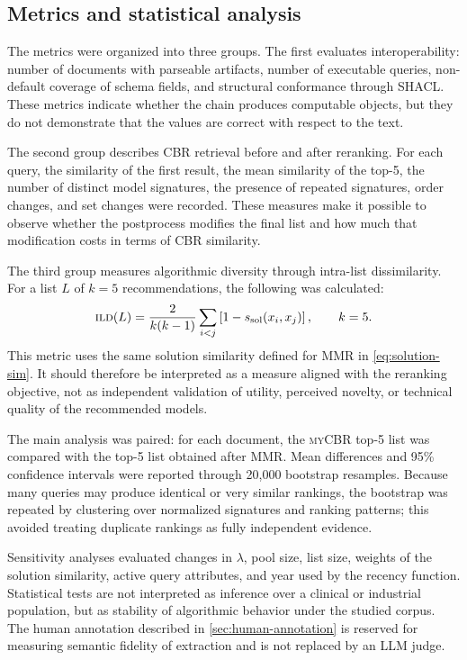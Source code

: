\documentclass[journal]{IEEEtran}
\newcommand{\myCBR}{\textsc{myCBR}}
\newcommand{\ILD}{\textsc{ild}}
\begin{document}
\subsection{Metrics and statistical analysis}

The metrics were organized into three groups. The first evaluates interoperability: number of documents with parseable artifacts, number of executable queries, non-default coverage of schema fields, and structural conformance through SHACL. These metrics indicate whether the chain produces computable objects, but they do not demonstrate that the values are correct with respect to the text.

The second group describes CBR retrieval before and after reranking. For each query, the similarity of the first result, the mean similarity of the top-5, the number of distinct model signatures, the presence of repeated signatures, order changes, and set changes were recorded. These measures make it possible to observe whether the postprocess modifies the final list and how much that modification costs in terms of CBR similarity.

The third group measures algorithmic diversity through intra-list dissimilarity. For a list $L$ of $k=5$ recommendations, the following was calculated:
\begin{equation}
 \ILD(L)=\frac{2}{k(k-1)}\sum_{i<j}\left[1-s_{\mathrm{sol}}(x_i,x_j)\right],\qquad k=5.
 \label{eq:ild}
\end{equation}
This metric uses the same solution similarity defined for MMR in \cref{eq:solution-sim}. It should therefore be interpreted as a measure aligned with the reranking objective, not as independent validation of utility, perceived novelty, or technical quality of the recommended models.

The main analysis was paired: for each document, the \myCBR{} top-5 list was compared with the top-5 list obtained after MMR. Mean differences and 95\% confidence intervals were reported through 20,000 bootstrap resamples. Because many queries may produce identical or very similar rankings, the bootstrap was repeated by clustering over normalized signatures and ranking patterns; this avoided treating duplicate rankings as fully independent evidence.

Sensitivity analyses evaluated changes in $\lambda$, pool size, list size, weights of the solution similarity, active query attributes, and year used by the recency function. Statistical tests are not interpreted as inference over a clinical or industrial population, but as stability of algorithmic behavior under the studied corpus. The human annotation described in \cref{sec:human-annotation} is reserved for measuring semantic fidelity of extraction and is not replaced by an LLM judge.



\end{document}
